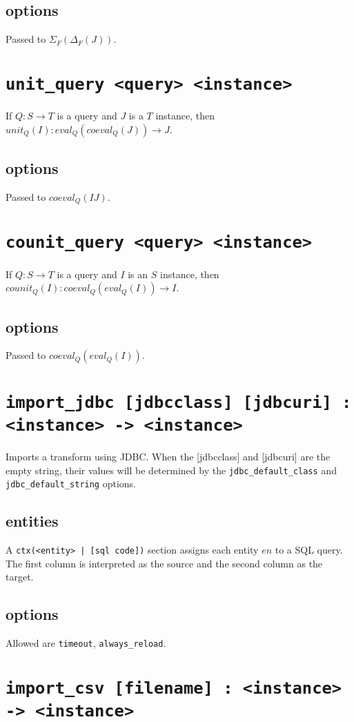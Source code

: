 \documentclass[10pt]{book}
\begin{document}
\subsection{options}
Passed to $\Sigma_F(\Delta_F(J))$.

\section{{\tt unit\_query <query> <instance>}}
If $Q : S \to T$ is a query and $J$ is a $T$ instance, then $unit_Q(I) : eval_Q(coeval_Q(J)) \to J$.
\subsection{options}
Passed to $coeval_Q(IJ)$.

\section{{\tt counit\_query <query> <instance>}}
If $Q : S \to T$ is a query and $I$ is an $S$ instance, then $counit_Q(I) : coeval_Q(eval_Q(I))  \to I$.
\subsection{options}
Passed to $coeval_Q(eval_Q(I))$.

\section{{\tt import\_jdbc  [jdbcclass] [jdbcuri] : <instance> -> <instance>}}
Imports a transform using JDBC. When the [jdbcclass] and [jdbcuri] are the empty string, their values will be determined by the {\tt jdbc\_default\_class} and {\tt jdbc\_default\_string} options.

\subsection{entities}
A {\tt ctx(<entity> | [sql code])} section assigns each entity $en$ to a SQL query.  The first column is interpreted as the source and the second column as the target.

\subsection{options}
Allowed are {\tt timeout}, {\tt always\_reload}.  

\section{{\tt import\_csv [filename] : <instance> -> <instance>}} 
\end{document}
